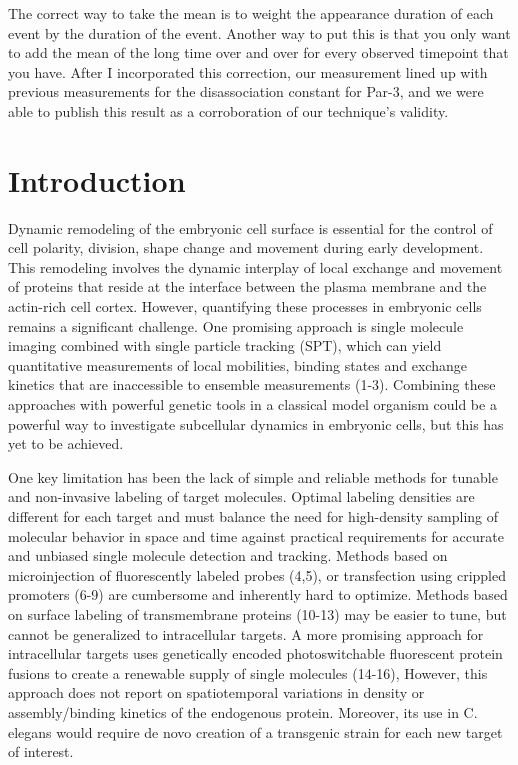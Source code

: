 The correct way to take the mean is to weight the appearance duration of each event by the duration of the event.  Another way to put this is that you only want to add the mean of the long time over and over for every observed timepoint that you have.  After I incorporated this correction, our measurement lined up with previous measurements for the disassociation constant for Par-3, and we were able to publish this result as a corroboration of our technique's validity.

\section{Introduction}
 
 Dynamic remodeling of the embryonic cell surface is essential for the control of cell polarity, division, shape change and movement during early development. This remodeling involves the dynamic interplay of local exchange and movement of proteins that reside at the interface between the plasma membrane and the actin-rich cell cortex. However, quantifying these processes in embryonic cells remains a significant challenge. One promising approach is single molecule imaging combined with single particle tracking (SPT), which can yield quantitative measurements of local mobilities, binding states and exchange kinetics that are inaccessible to ensemble measurements (1-3). Combining these approaches with powerful genetic tools in a classical model organism could be a powerful way to investigate subcellular dynamics in embryonic cells, but this has yet to be achieved.
 
 
 One key limitation has been the lack of simple and reliable methods for tunable and non-invasive labeling of target molecules. Optimal labeling densities are different for each target and must balance the need for high-density sampling of molecular behavior in space and time against practical requirements for accurate and unbiased single molecule detection and tracking. Methods based on microinjection of fluorescently labeled probes (4,5), or transfection using crippled promoters (6-9) are cumbersome and inherently hard to optimize. Methods based on surface labeling of transmembrane proteins (10-13) may be easier to tune, but cannot be generalized to intracellular targets. A more promising approach for intracellular targets uses genetically encoded photoswitchable fluorescent protein fusions to create a renewable supply of single molecules (14-16), However, this approach does not report on spatiotemporal variations in density or assembly/binding kinetics of the endogenous protein. Moreover, its use in C. elegans would require de novo creation of a transgenic strain for each new target of interest.
 
